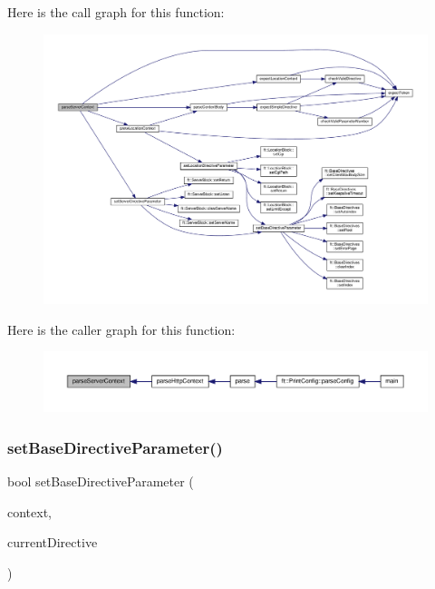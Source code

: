 Here is the call graph for this function\+:
\nopagebreak
\begin{figure}[H]
\begin{center}
\leavevmode
\includegraphics[width=350pt]{classft_1_1_parser_ae53bb700e0344f7af2519a5af3ae4230_cgraph}
\end{center}
\end{figure}
Here is the caller graph for this function\+:
\nopagebreak
\begin{figure}[H]
\begin{center}
\leavevmode
\includegraphics[width=350pt]{classft_1_1_parser_ae53bb700e0344f7af2519a5af3ae4230_icgraph}
\end{center}
\end{figure}
\mbox{\label{classft_1_1_parser_a9f412d172694519d0d8dd9edacd257c0}} 
\subsubsection{\texorpdfstring{set\+Base\+Directive\+Parameter()}{setBaseDirectiveParameter()}}
{\footnotesize\ttfamily bool set\+Base\+Directive\+Parameter (\begin{DoxyParamCaption}\item[{\hyperlink{classft_1_1_base_directives}{Base\+Directives} \&}]{context,  }\item[{std\+::vector$<$ \hyperlink{classft_1_1_directive}{Directive} $>$\+::iterator \&}]{current\+Directive }\end{DoxyParamCaption})\hspace{0.3cm}{\ttfamily [private]}}



